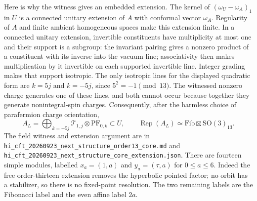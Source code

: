 \documentclass[11pt,a4paper]{article}
\theoremstyle{definition}
\newcommand{\artifact}[1]{\textnormal{\nolinkurl{#1}}}
\begin{document}
Here is why the witness gives an embedded extension. The kernel of
$(\omega_U-\omega_A)_1$ in $U$ is a connected unitary extension of
$A$ with conformal vector $\omega_A$. Regularity of $A$ and finite
ambient homogeneous spaces make this extension finite. In a connected
unitary extension, invertible constituents have multiplicity at most
one and their support is a subgroup: the invariant pairing gives a
nonzero product of a constituent with its inverse into the vacuum
line; associativity then makes multiplication by it invertible on
each supported invertible line. Integer grading makes that support
isotropic. The only isotropic lines for the displayed quadratic form
are $k=5j$ and $k=-5j$, since $5^2=-1\pmod{13}$. The witnessed
nonzero charge generates one of these lines, and both cannot occur
because together they generate nonintegral-spin charges. Consequently,
after the harmless choice of parafermion charge orientation,
\[
 A_L=\bigoplus_{k=-5j}\mathcal T_{1,j}\otimes\mathrm{PF}_{0,k}
 \subset U,\qquad
 \operatorname{Rep}(A_L)\simeq
 \mathrm{Fib}\boxtimes\mathrm{SO}(3)_{13}.
\]
The field witness and extension argument are in
\artifact{hi_cft_20260923_next_structure_order13_core.md} and
\artifact{hi_cft_20260923_next_structure_core_extension.json}.
There are fourteen simple modules, labelled $x_a=(1,a)$ and
$y_a=(\tau,a)$ for $0\le a\le6$. Indeed the free order-thirteen
extension removes the hyperbolic pointed factor; no orbit has a
stabilizer, so there is no fixed-point resolution. The two remaining
labels are the Fibonacci label and the even affine label $2a$.
\end{document}
